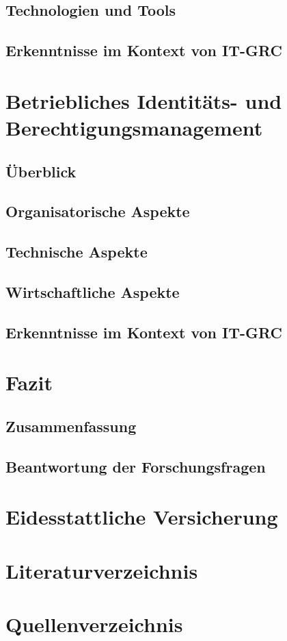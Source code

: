 \documentclass[10pt]{article}
\begin{document}
\subsection{Technologien und Tools}
\subsection{Erkenntnisse im Kontext von IT-GRC}
\section{Betriebliches Identitäts- und Berechtigungsmanagement}
\subsection{Überblick}
\subsection{Organisatorische Aspekte}
\subsection{Technische Aspekte}
\subsection{Wirtschaftliche Aspekte}
\subsection{Erkenntnisse im Kontext von IT-GRC}
\section{Fazit}
\subsection{Zusammenfassung}
\subsection{Beantwortung der Forschungsfragen}
\section{Eidesstattliche Versicherung}
\section{Literaturverzeichnis}
\section{Quellenverzeichnis}
\printbibliography
\end{document}
